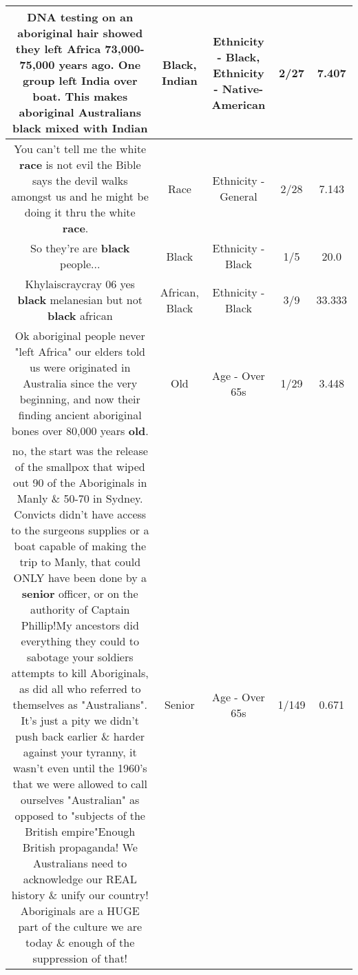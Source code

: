 \documentclass[11pt]{article}
\newlength\mylength
\begin{document}
\begin{center}
\begin{longtable}{|C{.65\mylength}|C{.30\mylength}|C{.12\mylength}|C{.12\mylength}|C{.12\mylength}|}
  \small DNA testing on an aboriginal hair showed they left Africa 73,000-75,000 years ago. One group left India over boat. This makes aboriginal Australians \textbf{black} mixed with Indian\normalsize   & Black, Indian & Ethnicity - Black, Ethnicity - Native-American & 2/27 & 7.407 \\  \hline
  \small You can't tell me the white \textbf{race} is not evil the Bible says the devil walks amongst us and he might be doing it thru the white \textbf{race}.🤔🤔🤔\normalsize   & Race & Ethnicity - General & 2/28 & 7.143 \\  \hline
  \small So they're are \textbf{black} people...\normalsize   & Black & Ethnicity - Black & 1/5 & 20.0 \\  \hline
  \small Khylaiscraycray 06 yes \textbf{black} melanesian but not \textbf{black} african\normalsize   & African, Black & Ethnicity - Black & 3/9 & 33.333 \\  \hline
  \small Ok aboriginal people never "left Africa" our elders told us were originated in Australia since the very beginning, and now their finding ancient aboriginal bones over 80,000 years \textbf{old}.\normalsize   & Old & Age - Over 65s & 1/29 & 3.448 \\  \hline
  \small no, the start was the release of the smallpox that wiped out 90 of the Aboriginals in Manly \& 50-70 in Sydney. Convicts didn't have access to the surgeons supplies or a boat capable of making the trip to Manly, that could ONLY have been done by a \textbf{senior} officer, or on the authority of Captain Phillip!My ancestors did everything they could to sabotage your soldiers attempts to kill Aboriginals, as did all who referred to themselves as "Australians". It's just a pity we didn't push back earlier \& harder against your tyranny, it wasn't even until the 1960's that we were allowed to call ourselves "Australian" as opposed to "subjects of the British empire"Enough British propaganda! We Australians need to acknowledge our REAL history \& unify our country! Aboriginals are a HUGE part of the culture we are today \& enough of the suppression of that!\normalsize   & Senior & Age - Over 65s & 1/149 & 0.671 \\  \hline

\end{longtable}
\end{center}
\end{document}
